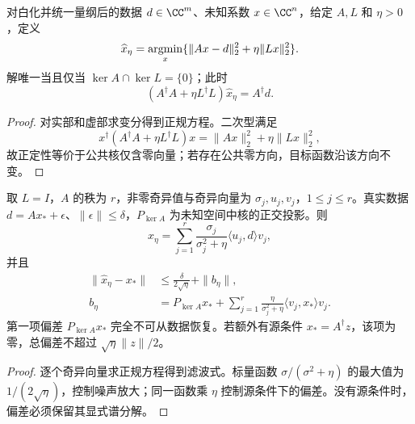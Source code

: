 \begin{theorem}
对白化并统一量纲后的数据 $d\in\CC^m$、未知系数 $x\in\CC^n$，给定 $A,L$ 和 $\eta>0$，定义
\begin{equation}
\widehat x_\eta=\mathop{\rm argmin}_x
\{\|Ax-d\|_2^2+\eta\|Lx\|_2^2\}.
\label{eq:feqo-tikhonov-regularization}
\end{equation}
解唯一当且仅当 $\ker A\cap\ker L=\{0\}$；此时
\begin{equation}
(A^\dagger A+\eta L^\dagger L)\widehat x_\eta=A^\dagger d.
\label{eq:feqo-tikhonov-normal}
\end{equation}
\end{theorem}
\begin{proof}
对实部和虚部求变分得到正规方程。二次型满足
\[
x^\dagger(A^\dagger A+\eta L^\dagger L)x
=\|Ax\|_2^2+\eta\|Lx\|_2^2,
\]
故正定性等价于公共核仅含零向量；若存在公共零方向，目标函数沿该方向不变。
\end{proof}

\begin{proposition}[奇异值滤波与误差界]
取 $L=I$，$A$ 的秩为 $r$，非零奇异值与奇异向量为 $\sigma_j,u_j,v_j$，$1\le j\le r$。真实数据 $d=Ax_*+\epsilon$、$\|\epsilon\|\le\delta$，$P_{\ker A}$ 为未知空间中核的正交投影。则
\begin{equation}
\widehat x_\eta=\sum_{j=1}^r\frac{\sigma_j}{\sigma_j^2+\eta}
\langle u_j,d\rangle v_j,
\label{eq:feqo-imaging-field-inversion}
\end{equation}
并且
\begin{align}
\|\widehat x_\eta-x_*\|
&\le\frac{\delta}{2\sqrt\eta}+\|b_\eta\|,\label{eq:feqo-tikhonov-error-bound}\\
b_\eta&=P_{\ker A}x_*+
\sum_{j=1}^r\frac{\eta}{\sigma_j^2+\eta}\langle v_j,x_*\rangle v_j.
\label{eq:feqo-tikhonov-bias}
\end{align}
第一项偏差 $P_{\ker A}x_*$ 完全不可从数据恢复。若额外有源条件 $x_*=A^\dagger z$，该项为零，总偏差不超过 $\sqrt\eta\|z\|/2$。
\end{proposition}
\begin{proof}
逐个奇异向量求正规方程得到滤波式。标量函数 $\sigma/(\sigma^2+\eta)$ 的最大值为 $1/(2\sqrt\eta)$，控制噪声放大；同一函数乘 $\eta$ 控制源条件下的偏差。没有源条件时，偏差必须保留其显式谱分解。
\end{proof}

